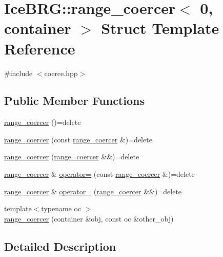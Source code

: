 \hypertarget{structIceBRG_1_1range__coercer_3_010_00_01container_01_4}{}\section{Ice\+B\+R\+G\+:\+:range\+\_\+coercer$<$ 0, container $>$ Struct Template Reference}
\label{structIceBRG_1_1range__coercer_3_010_00_01container_01_4}


{\ttfamily \#include $<$coerce.\+hpp$>$}

\subsection*{Public Member Functions}
\begin{DoxyCompactItemize}
\item 
\hyperlink{structIceBRG_1_1range__coercer_3_010_00_01container_01_4_ab8eee61ccd33338df00c333d9f83df3e}{range\+\_\+coercer} ()=delete
\item 
\hyperlink{structIceBRG_1_1range__coercer_3_010_00_01container_01_4_a5bb06ccd49c84debc7ec3cb9c85bc663}{range\+\_\+coercer} (const \hyperlink{structIceBRG_1_1range__coercer}{range\+\_\+coercer} \&)=delete
\item 
\hyperlink{structIceBRG_1_1range__coercer_3_010_00_01container_01_4_a08e44e0576953ef8244a5c220e52282a}{range\+\_\+coercer} (\hyperlink{structIceBRG_1_1range__coercer}{range\+\_\+coercer} \&\&)=delete
\item 
\hyperlink{structIceBRG_1_1range__coercer}{range\+\_\+coercer} \& \hyperlink{structIceBRG_1_1range__coercer_3_010_00_01container_01_4_a066bcbf6631613bcf5029422f56b4ae2}{operator=} (const \hyperlink{structIceBRG_1_1range__coercer}{range\+\_\+coercer} \&)=delete
\item 
\hyperlink{structIceBRG_1_1range__coercer}{range\+\_\+coercer} \& \hyperlink{structIceBRG_1_1range__coercer_3_010_00_01container_01_4_aa886cc57e6cd11dbcfdb6a3c25d47fb0}{operator=} (\hyperlink{structIceBRG_1_1range__coercer}{range\+\_\+coercer} \&\&)=delete
\item 
{\footnotesize template$<$typename oc $>$ }\\\hyperlink{structIceBRG_1_1range__coercer_3_010_00_01container_01_4_a0f9ef5eb597dda0517fe131d46b8e41d}{range\+\_\+coercer} (container \&obj, const oc \&other\+\_\+obj)
\end{DoxyCompactItemize}


\subsection{Detailed Description}
